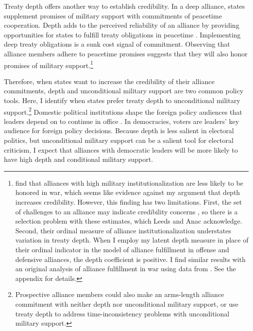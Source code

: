 \documentclass[12pt]{article}
\begin{document}


Treaty depth offers another way to establish credibility.
In a deep alliance, states supplement promises of military support with commitments of peacetime cooperation.  
Depth adds to the perceived reliability of an alliance by providing opportunities for states to fulfill treaty obligations in peacetime \citep{Morrow1994}. 
Implementing deep treaty obligations is a sunk cost signal of commitment.
Observing that alliance members adhere to peacetime promises suggests that they will also honor promises of military support.\footnote{\citet{LeedsAnac2005} find that alliances with high military institutionalization are less likely to be honored in war, which seems like evidence against my argument that depth increases credibility. 
However, this finding has two limitations. 
First, the set of challenges to an alliance may indicate credibility concerns \citep{Smith1995}, so there is a selection problem with these estimates, which Leeds and Anac acknowledge. 
Second, their ordinal measure of alliance institutionalization understates variation in treaty depth. 
When I employ my latent depth measure in place of their ordinal indicator in the model of alliance fulfillment in offense and defensive alliances, the depth coefficient is positive. 
I find similar results with an original analysis of alliance fulfillment in war using data from \citet{BerkemeierFuhrmann2018}.
See the appendix for details.} 


Therefore, when states want to increase the credibility of their alliance commitments, depth and unconditional military support are two common policy tools. 
Here, I identify when states prefer treaty depth to unconditional military support.\footnote{Prospective alliance members could also make an arms-length alliance commitment with neither depth nor unconditional military support, or use treaty depth to address time-inconsistency problems with unconditional military support.}
Domestic political institutions shape the foreign policy audiences that leaders depend on to continue in office \citep{Weeks2008}. 
In democracies, voters are leaders' key audience for foreign policy decisions.  
Because depth is less salient in electoral politics, but unconditional military support can be a salient tool for electoral criticism, I expect that alliances with democratic leaders will be more likely to have high depth and conditional military support. 
\end{document}
